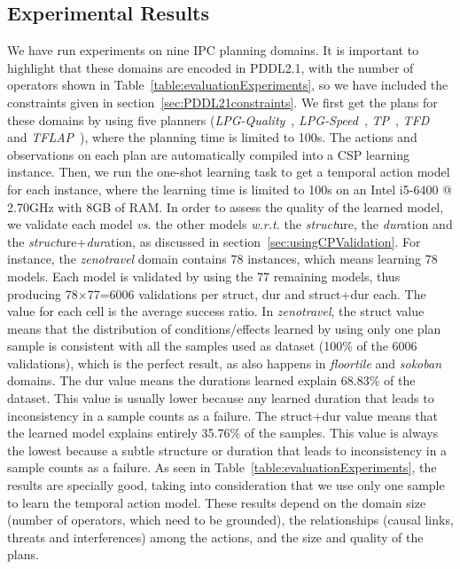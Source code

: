 \documentclass[runningheads]{llncs}
\begin{document}
\subsection{Experimental Results}

We have run experiments on nine IPC planning domains. It is important to highlight that these domains are encoded in PDDL2.1, with the number of operators shown in Table~\ref{table:evaluationExperiments}, so we have included the constraints given in section~\ref{sec:PDDL21constraints}. We first get the plans for these domains by using five planners (\textit{LPG-Quality}~\cite{gerevini2003planning}, \textit{LPG-Speed}~\cite{gerevini2003planning}, \textit{TP}~\cite{jimenez2015temporal}, \textit{TFD}~\cite{eyerich2009using} and \textit{TFLAP}~\cite{marzal2016temporal}), where the planning time is limited to 100s.
The actions and observations on each plan are automatically compiled into a CSP learning instance. Then,
we run the one-shot learning task to get a temporal action model for each instance, where the learning time is limited to 100s on an Intel i5-6400 @ 2.70GHz with 8GB of RAM.
In order to assess the quality of the learned model, we validate each model \emph{vs.} the other models \emph{w.r.t.} the \emph{struct}ure, the \emph{dur}ation and the \emph{struct}ure+\emph{dur}ation, as discussed in section~\ref{sec:usingCPValidation}.
For instance, the \emph{zenotravel} domain contains 78 instances, which means learning 78 models. Each model is validated by using the 77 remaining models, thus producing 78$\times$77=6006 validations per struct, dur and struct+dur each. The value for each cell is the average success ratio.
In \emph{zenotravel}, the struct value means that the distribution of conditions/effects learned by using only one plan sample is consistent with all the samples used as dataset (100\% of the 6006 validations), which is the perfect result, as also happens in \emph{floortile} and \emph{sokoban} domains.
The dur value means the durations learned explain 68.83\% of the dataset. This value is usually lower because any learned duration that leads to inconsistency in a sample counts as a failure. The struct+dur value means that the learned model explains entirely 35.76\% of the samples. This value is always the lowest because a subtle structure or duration that leads to inconsistency in a sample counts as a failure.
As seen in Table~\ref{table:evaluationExperiments}, the results are specially good, taking into consideration that we use only one sample to learn the temporal action model.
These results depend on the domain size (number of operators, which need to be grounded), the relationships (causal links, threats and interferences) among the actions, and the size and quality of the plans.
\end{document}
